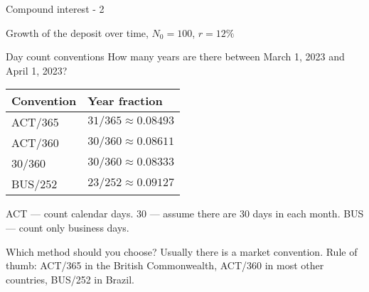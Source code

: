 \documentclass{beamer}
\begin{document}
\begin{frame}{Compound interest - 2}

	\centering
	\scriptsize{Growth of the deposit over time, $N_0=100$, $r=12\%$}
\end{frame}



\begin{frame}{Day count conventions}
\justify
How many years are there between March 1, 2023 and April 1, 2023?

\justify
\centering
\begin{tabular}{l|l}
Convention & Year fraction \\ \hline
ACT/365 & $31/365 \approx 0.08493$ \\
ACT/360 & $30/360 \approx 0.08611$ \\
30/360  & $30/360 \approx 0.08333$ \\
BUS/252 & $23/252 \approx 0.09127$ 
\end{tabular}

\justify
ACT --- count calendar days. 30 --- assume there are 30 days in each month. BUS --- count only business days.

\justify
Which method should you choose? Usually there is a market convention. Rule of thumb: ACT/365 in the British Commonwealth, ACT/360 in most other countries, BUS/252 in Brazil. 
\end{frame}
\end{document}
